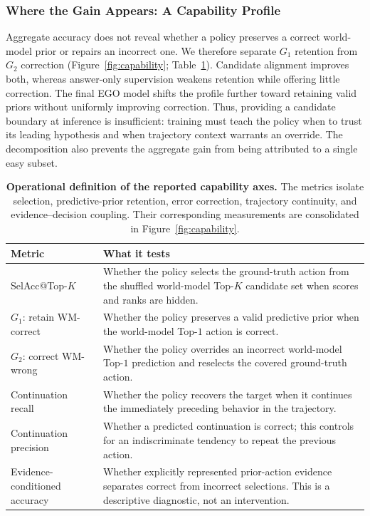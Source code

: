 \documentclass[letterpaper]{article}
\newcommand{\method}{\textsc{EGO}}
\begin{document}
\subsubsection{Where the Gain Appears: A Capability Profile}
\label{sec:er-axes}

Aggregate accuracy does not reveal whether a policy preserves a correct
world-model prior or repairs an incorrect one.  We therefore separate
$G_1$ retention from $G_2$ correction (Figure~\ref{fig:capability};
Table~\ref{tab:capability}).  Candidate alignment improves both, whereas
answer-only supervision weakens retention while offering little correction.
The final \method{} model shifts the profile further toward retaining valid
priors without uniformly improving correction.  Thus, providing a candidate
boundary at inference is insufficient: training must teach the policy when
to trust its leading hypothesis and when trajectory context warrants an
override.  The decomposition also prevents the aggregate gain from being
attributed to a single easy subset.

\begin{table}[t]
\centering
\small
\setlength{\tabcolsep}{7pt}
\begin{tabular}{p{}p{}}
\toprule
Metric & What it tests \\
\midrule
SelAcc@Top-$K$
  & Whether the policy selects the ground-truth action from the shuffled
    world-model Top-$K$ candidate set when scores and ranks are hidden. \\
$G_1$: retain WM-correct
  & Whether the policy preserves a valid predictive prior when the
    world-model Top-$1$ action is correct. \\
$G_2$: correct WM-wrong
  & Whether the policy overrides an incorrect world-model Top-$1$ prediction
    and reselects the covered ground-truth action. \\
Continuation recall
  & Whether the policy recovers the target when it continues the immediately
    preceding behavior in the trajectory. \\
Continuation precision
  & Whether a predicted continuation is correct; this controls for an
    indiscriminate tendency to repeat the previous action. \\
Evidence-conditioned accuracy
  & Whether explicitly represented prior-action evidence separates correct
    from incorrect selections.  This is a descriptive diagnostic, not an
    intervention. \\
\bottomrule
\end{tabular}
\caption{\textbf{Operational definition of the reported capability axes.}
The metrics isolate selection, predictive-prior retention, error correction,
trajectory continuity, and evidence--decision coupling.  Their corresponding
measurements are consolidated in Figure~\ref{fig:capability}.}
\label{tab:capability}
\end{table}
\end{document}

